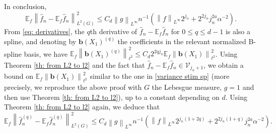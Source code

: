 \documentclass[preprint]{imsart}
\newcommand\norm[1]{\left\lVert#1\right\rVert}
\numberwithin{equation}{section}
\begin{document}
\begin{appendix}
In conclusion, 
\begin{equation}\label{variance stim sp}
    \mathbb{E}_f\norm{\hat{f}_n-\mathbb{E}_f\hat{f}_n}_{L^2(G)}^2 \leq C_d\norm{g}_{L^\infty}n^{-1}(\norm{f}_{L^\infty}2^{j_n} + 2^{2j_n}j_n^{2a}\alpha^{-2}).
\end{equation}
From \eqref{eq: derivatives}, the $q$th derivative of $\hat{f}_n-\mathbb{E}_f\hat{f}_n$ for $0\leq q\leq d-1$ is also a spline, and denoting by $\mathbf{b}(X_1)^{(q)}$ the coefficients in the relevant normalized B-spline basis, we have $\mathbb{E}_f\norm{\mathbf{b}(X_1)^{(q)}}_{\ell^2}^2\leq C_d 2^{2qj_n}\mathbb{E}_f\norm{\mathbf{b}(X_1)}_{\ell^2}^2$. Using Theorem \ref{th: from L2 to l2} and the fact that $\hat{f}_n-\mathbb{E}_f\hat{f}_n \in \mathcal{V}_{j_n+1}$, we obtain a bound on $\mathbb{E}_f\norm{\mathbf{b}(X_1)}_{\ell^2}^2$ similar to the one in \eqref{variance stim sp} (more precisely, we reproduce the above proof with $G$ the Lebesgue measure, $g=1$ and then use Theorem \ref{th: from L2 to l2}), up to a constant depending on $d$. Using Theorem \ref{th: from L2 to l2} again, we deduce that
\begin{equation}\label{variance stim sp derivatives}
    \mathbb{E}_f\norm{\hat{f}_n^{(q)}-\mathbb{E}_f\hat{f}_n^{(q)}}_{L^2(G)}^2 \leq C_d\norm{g}_{L^\infty}n^{-1}(\norm{f}_{L^\infty}2^{j_n(1+2q)} + 2^{2j_n(1+q)}j_n^{2a}\alpha^{-2}).
\end{equation}



\end{appendix}
\end{document}
